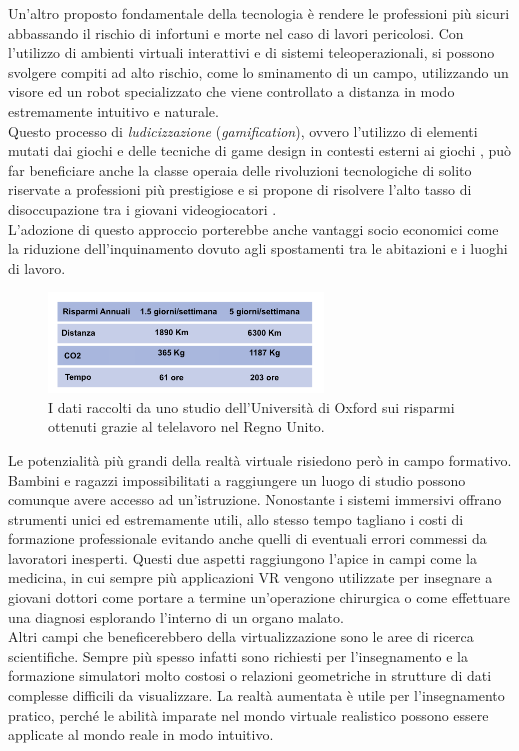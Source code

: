  Un'altro proposto fondamentale della tecnologia è rendere le professioni più sicuri abbassando il rischio di infortuni e morte nel caso di lavori pericolosi. Con l'utilizzo di ambienti virtuali interattivi e di sistemi teleoperazionali, si possono svolgere compiti ad alto rischio, come lo sminamento di un campo, utilizzando un visore ed un robot specializzato che viene controllato a distanza in modo estremamente intuitivo e naturale.\\
 Questo processo di \textit{ludicizzazione} (\textit{gamification}), ovvero l'utilizzo di elementi mutati dai giochi e delle tecniche di game design in contesti esterni ai giochi \cite{Gamification}, può far beneficiare anche la classe operaia delle rivoluzioni tecnologiche di solito riservate a professioni più prestigiose e si propone di risolvere l'alto tasso di disoccupazione tra i giovani videogiocatori \cite{Leisure}.\\
 L'adozione di questo approccio porterebbe anche vantaggi socio economici come la riduzione dell'inquinamento dovuto agli spostamenti tra le abitazioni e i luoghi di lavoro.  \cite{POL}
 \begin{figure}[H]
 	\includegraphics[width=0.65\textwidth]{figure/PolData}
 	\centering
 	\caption{I dati raccolti da uno studio dell'Università di Oxford sui risparmi ottenuti grazie al telelavoro nel Regno Unito.}
 \end{figure}
\newpage
Le potenzialità più grandi della realtà virtuale risiedono però in campo formativo. Bambini e ragazzi impossibilitati a raggiungere un luogo di studio possono comunque avere accesso ad un'istruzione. Nonostante i sistemi immersivi offrano strumenti unici ed estremamente utili, allo stesso tempo tagliano i costi di formazione professionale evitando anche quelli di eventuali errori commessi da lavoratori inesperti. Questi due aspetti raggiungono l'apice in campi come la medicina, in cui sempre più applicazioni VR vengono utilizzate per insegnare a giovani dottori come portare a termine un'operazione chirurgica o come effettuare una diagnosi esplorando l'interno di un organo malato. \\
Altri campi che beneficerebbero della virtualizzazione sono le aree di ricerca scientifiche. Sempre più spesso infatti sono richiesti per l'insegnamento e la formazione simulatori molto costosi o relazioni geometriche in strutture di dati complesse difficili da visualizzare.  La realtà aumentata è utile per l'insegnamento pratico, perché le abilità imparate nel mondo virtuale realistico possono essere applicate al mondo reale in modo intuitivo.\\
